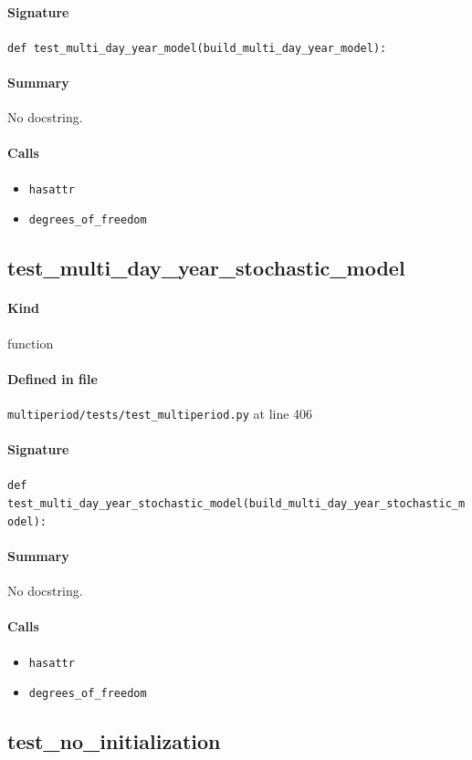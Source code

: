 \documentclass[11pt]{report}
\begin{document}
\paragraph{Signature} \texttt{def test\_multi\_day\_year\_model(build\_multi\_day\_year\_model):}
\paragraph{Summary} No docstring.
\paragraph{Calls}
\begin{itemize}[leftmargin=*]
  \item \texttt{hasattr}
  \item \texttt{degrees\_of\_freedom}
\end{itemize}
\subsection{test\_multi\_day\_year\_stochastic\_model}
\label{def:multiperiod-tests-test_multiperiod.py:test_multi_day_year_stochastic_model:L406}
\paragraph{Kind} function
\paragraph{Defined in file} \texttt{multiperiod/tests/test\_multiperiod.py} at line 406
\paragraph{Signature} \texttt{def test\_multi\_day\_year\_stochastic\_model(build\_multi\_day\_year\_stochastic\_model):}
\paragraph{Summary} No docstring.
\paragraph{Calls}
\begin{itemize}[leftmargin=*]
  \item \texttt{hasattr}
  \item \texttt{degrees\_of\_freedom}
\end{itemize}
\subsection{test\_no\_initialization}
\label{def:multiperiod-tests-test_multiperiod.py:test_no_initialization:L429}
\end{document}
